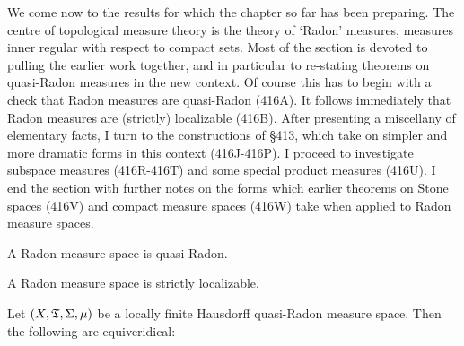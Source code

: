 
\def\chaptername{Topologies and measures I}
\def\sectionname{Radon measure spaces}


We come now to the results for which the chapter so far has been
preparing.   The centre of topological measure theory is the theory of
`Radon' measures,
measures inner regular with respect to compact sets.   Most of the
section is devoted to pulling the earlier work together, and in
particular to
re-stating theorems on quasi-Radon measures in the new context.   Of
course this has to begin with a check that Radon measures are
quasi-Radon
(416A).   It follows immediately that Radon measures are (strictly)
localizable (416B).   After presenting a miscellany of elementary facts,
I turn to the constructions of \S413, which take on simpler and more
dramatic forms in this context (416J-416P).   I proceed to investigate
subspace measures (416R-416T) and some special product measures
(416U).   I end the section
with further notes on the forms which earlier theorems on Stone spaces
(416V) and compact measure spaces (416W) take when applied to Radon
measure spaces.

 A Radon measure space is quasi-Radon.


 A Radon measure space is strictly localizable.


 Let $(X,\frak T,\Sigma,\mu)$ be a locally
finite Hausdorff quasi-Radon measure space.   Then the following are
equiveridical:



